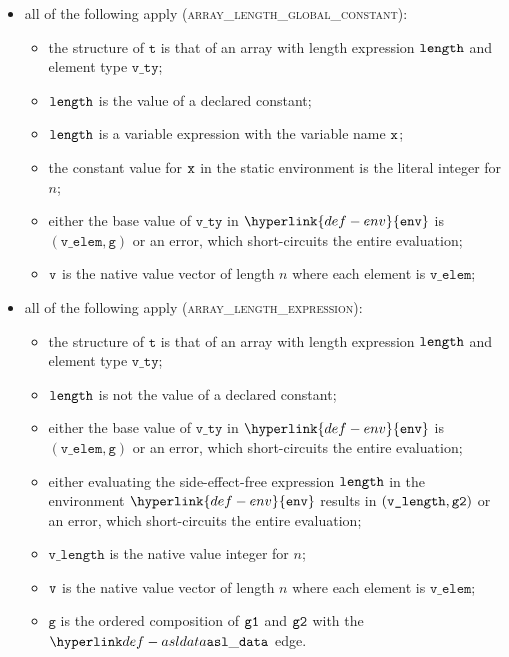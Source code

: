 \documentclass{book}
\newcommand\env[0]{\hyperlink{def-env}{\texttt{env}}}
\newcommand\vg[0]{\texttt{g}}
\newcommand\vt[0]{\texttt{t}}
\newcommand\vlength[0]{\texttt{v\_length}}
\newcommand\vvty[0]{\texttt{v\_ty}}
\newcommand\velem[0]{\texttt{v\_elem}}
\begin{document}
\begin{itemize}
  \item all of the following apply (\textsc{array\_length\_global\_constant}):
  \begin{itemize}
    \item the structure of $\vt$ is that of an array with length expression $\texttt{length}$ and element type $\vvty$;
    \item $\texttt{length}$ is the value of a declared constant;
    \item $\texttt{length}$ is a variable expression with the variable name $\texttt{x}$;
    \item the constant value for $\texttt{x}$ in the static environment is the literal integer for $n$;
    \item either the base value of $\vvty$ in $\env$ is $(\velem, \vg)$ or an error, which short-circuits
    the entire evaluation;
    \item $\texttt{v}$ is the native value vector of length $n$ where each element is $\velem$;
  \end{itemize}

  \item all of the following apply (\textsc{array\_length\_expression}):
  \begin{itemize}
    \item the structure of $\vt$ is that of an array with length expression $\texttt{length}$ and element type $\vvty$;
    \item $\texttt{length}$ is not the value of a declared constant;
    \item either the base value of $\vvty$ in $\env$ is $(\velem, \vg)$ or an error, which short-circuits
    the entire evaluation;
    \item either evaluating the side-effect-free expression $\texttt{length}$ in the environment $\env$
    results in $(\vlength, \vgtwo)$ or an error, which short-circuits
    the entire evaluation;
    \item $\vlength$ is the native value integer for $n$;
    \item $\texttt{v}$ is the native value vector of length $n$ where each element is $\velem$;
    \item $\vg$ is the ordered composition of $\texttt{g1}$ and $\texttt{g2}$ with the $\asldata$ edge.
  \end{itemize}
\end{itemize}
\end{document}
